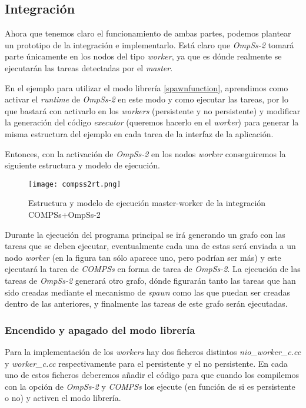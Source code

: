 \subsection{Integración}

Ahora que tenemos claro el funcionamiento de ambas partes, podemos plantear un prototipo de la integración e implementarlo. Está claro que \textit{OmpSs-2} tomará parte únicamente en los nodos del tipo \textit{worker}, ya que es dónde realmente se ejecutarán las tareas detectadas por el \textit{master}. 
\par\medskip

En el ejemplo para utilizar el modo librería \ref{spawnfunction}, aprendimos como activar el \textit{runtime} de \textit{OmpSs-2} en este modo y como ejecutar las tareas, por lo que bastará con activarlo en los \textit{workers} (persistente y no persistente) y modificar la generación del código \textit{executor} (queremos hacerlo en el \textit{worker}) para generar la misma estructura del ejemplo en cada tarea de la interfaz de la aplicación.
\par\medskip
Entonces, con la activación de \textit{OmpSs-2} en los nodos \textit{worker} conseguiremos la siguiente estructura y modelo de ejecución.

\begin{figure}[H]
    \centering 
    \caption{Estructura y modelo de ejecución master-worker de la integración COMPSs+OmpSs-2}
    \texttt{[image: compss2rt.png]}
    \label{fig:compssompssrt}
\end{figure}

Durante la ejecución del programa principal se irá generando un grafo con las tareas que se deben ejecutar, eventualmente cada una de estas será enviada a un nodo \textit{worker} (en la figura tan sólo aparece uno, pero podrían ser más) y este ejecutará la tarea de \textit{COMPSs} en forma de tarea de \textit{OmpSs-2}.
La ejecución de las tareas de \textit{OmpSs-2} generará otro grafo, dónde figurarán tanto las tareas que han sido creadas mediante el mecanismo de \textit{spawn} como las que puedan ser creadas dentro de las anteriores, y finalmente las tareas de este grafo serán ejecutadas.

\subsubsection{Encendido y apagado del modo librería}

Para la implementación de los \textit{workers} hay dos ficheros distintos \textit{nio\_worker\_c.cc} y \textit{worker\_c.cc} respectivamente para el persistente y el no persistente. En cada uno de estos ficheros deberemos añadir el código para que cuando los compilemos con la opción de \textit{OmpSs-2} y \textit{COMPSs} los ejecute (en función de si es persistente o no) y activen el modo librería.
\bigskip

